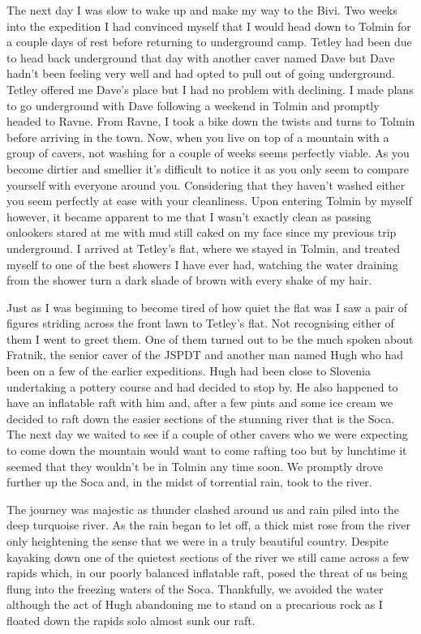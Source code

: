 The next day I was slow to wake up and make my way to the Bivi. Two
weeks into the expedition I had convinced myself that I would head down
to Tolmin for a couple days of rest before returning to underground
camp. Tetley had been due to head back underground that day with another
caver named Dave but Dave hadn't been feeling very well and had opted to
pull out of going underground. Tetley offered me Dave's place but I had
no problem with declining. I made plans to go underground with Dave
following a weekend in Tolmin and promptly headed to Ravne. From Ravne,
I took a bike down the twists and turns to Tolmin before arriving in the
town. Now, when you live on top of a mountain with a group of cavers,
not washing for a couple of weeks seems perfectly viable. As you become
dirtier and smellier it's difficult to notice it as you only seem to
compare yourself with everyone around you. Considering that they haven't
washed either you seem perfectly at ease with your cleanliness. Upon
entering Tolmin by myself however, it became apparent to me that I
wasn't exactly clean as passing onlookers stared at me with mud still
caked on my face since my previous trip underground. I arrived at
Tetley's flat, where we stayed in Tolmin, and treated myself to one of
the best showers I have ever had, watching the water draining from the
shower turn a dark shade of brown with every shake of my hair.

Just as I was beginning to become tired of how quiet the flat was I saw
a pair of figures striding across the front lawn to Tetley's flat. Not
recognising either of them I went to greet them. One of them turned out
to be the much spoken about Fratnik, the senior caver of the JSPDT and
another man named Hugh who had been on a few of the earlier expeditions.
Hugh had been close to Slovenia undertaking a pottery course and had
decided to stop by. He also happened to have an inflatable raft with him
and, after a few pints and some ice cream we decided to raft down the
easier sections of the stunning river that is the Soca. The next day we
waited to see if a couple of other cavers who we were expecting to come
down the mountain would want to come rafting too but by lunchtime it
seemed that they wouldn't be in Tolmin any time soon. We promptly drove
further up the Soca and, in the midst of torrential rain, took to the
river.

The journey was majestic as thunder clashed around us and rain piled
into the deep turquoise river. As the rain began to let off, a thick
mist rose from the river only heightening the sense that we were in a
truly beautiful country. Despite kayaking down one of the quietest
sections of the river we still came across a few rapids which, in our
poorly balanced inflatable raft, posed the threat of us being flung into
the freezing waters of the Soca. Thankfully, we avoided the water
although the act of Hugh abandoning me to stand on a precarious rock as
I floated down the rapids solo almost sunk our raft.

